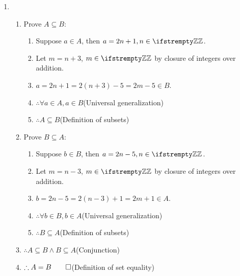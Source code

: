 \documentclass[12pt, a4paper]{article}
\begin{document}
\begin{enumerate}[Q\arabic*.]
  \item 
    \begin{enumerate}[\arabic*.]
      \item Prove $A \subseteq B$:
        \begin{enumerate}[label=1.\arabic*]
          \item Suppose $a \in A$, then $a = 2n+1, n \in \ZZ$.
          \item Let $m = n+3$,  $m \in \ZZ$ by closure of integers over addition.
          \item $a = 2n+1 = 2(n+3)-5 = 2m-5 \in B$.
          \item $\therefore \forall a \in A, a \in B$\hfill(Universal generalization)
          \item $\therefore A \subseteq B$\hfill(Definition of subsets)
        \end{enumerate}
      \item Prove $B \subseteq A$:
        \begin{enumerate}[label=2.\arabic*]
          \item Suppose $b \in B$, then $a = 2n-5, n \in \ZZ$.
          \item Let $m = n-3$,  $m \in \ZZ$ by closure of integers over addition.
          \item $b = 2n-5 = 2(n-3)+1 = 2m+1 \in A$.
          \item $\therefore \forall b \in B, b \in A$\hfill(Universal generalization)
          \item $\therefore B \subseteq A$\hfill(Definition of subsets)
        \end{enumerate}
      \item $\therefore A \subseteq B \land B \subseteq A$\hfill(Conjunction)
      \item $\therefore A = B \qed$\hfill(Definition of set equality)
    \end{enumerate}
  \pagebreak


\end{enumerate}
\end{document}

